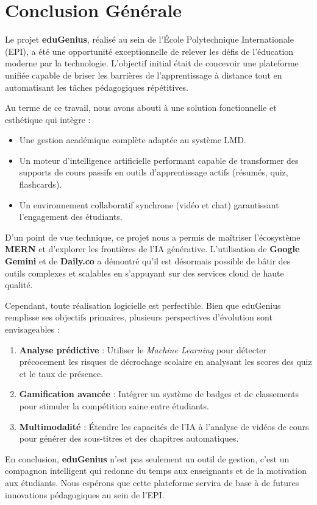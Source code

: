 \chapter*{Conclusion Générale}

Le projet \textbf{eduGenius}, réalisé au sein de l'École Polytechnique Internationale (EPI), a été une opportunité exceptionnelle de relever les défis de l'éducation moderne par la technologie. L'objectif initial était de concevoir une plateforme unifiée capable de briser les barrières de l'apprentissage à distance tout en automatisant les tâches pédagogiques répétitives.

Au terme de ce travail, nous avons abouti à une solution fonctionnelle et esthétique qui intègre :
\begin{itemize}
    \item Une gestion académique complète adaptée au système LMD.
    \item Un moteur d'intelligence artificielle performant capable de transformer des supports de cours passifs en outils d'apprentissage actifs (résumés, quiz, flashcards).
    \item Un environnement collaboratif synchrone (vidéo et chat) garantissant l'engagement des étudiants.
\end{itemize}

D'un point de vue technique, ce projet nous a permis de maîtriser l'écosystème \textbf{MERN} et d'explorer les frontières de l'IA générative. L'utilisation de \textbf{Google Gemini} et de \textbf{Daily.co} a démontré qu'il est désormais possible de bâtir des outils complexes et scalables en s'appuyant sur des services cloud de haute qualité.

Cependant, toute réalisation logicielle est perfectible. Bien que eduGenius remplisse ses objectifs primaires, plusieurs perspectives d'évolution sont envisageables :
\begin{enumerate}
    \item \textbf{Analyse prédictive} : Utiliser le \textit{Machine Learning} pour détecter précocement les risques de décrochage scolaire en analysant les scores des quiz et le taux de présence.
    \item \textbf{Gamification avancée} : Intégrer un système de badges et de classements pour stimuler la compétition saine entre étudiants.
    \item \textbf{Multimodalité} : Étendre les capacités de l'IA à l'analyse de vidéos de cours pour générer des sous-titres et des chapitres automatiques.
\end{enumerate}

En conclusion, \textbf{eduGenius} n'est pas seulement un outil de gestion, c'est un compagnon intelligent qui redonne du temps aux enseignants et de la motivation aux étudiants. Nous espérons que cette plateforme servira de base à de futures innovations pédagogiques au sein de l'EPI.
